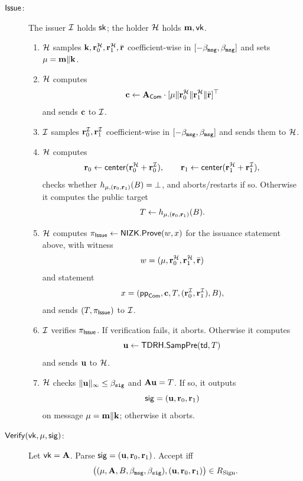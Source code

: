 \begin{description}
  \item[$\mathsf{Issue}$:] The issuer \(\mathcal{I}\) holds \(\mathsf{sk}\); the holder \(\mathcal{H}\) holds \(\mathbf{m},\mathsf{vk}\).
  \begin{enumerate}[leftmargin=1.25em]
    \item \(\mathcal{H}\) samples \(\mathbf{k},\mathbf{r}_0^{\mathcal{H}},\mathbf{r}_1^{\mathcal{H}},\bar{\mathbf{r}}\) coefficient-wise in
    \([ -\beta_{\mathtt{msg}},\beta_{\mathtt{msg}}]\) and sets \(\mathbf{\mu}=\mathbf{m}\Vert \mathbf{k}\).
    \item \(\mathcal{H}\) computes
    \[
      \mathbf{c}\gets \mathbf{A}_{\mathsf{Com}}\cdot[\mathbf{\mu}\Vert \mathbf{r}_0^{\mathcal{H}}\Vert \mathbf{r}_1^{\mathcal{H}}\Vert \bar{\mathbf{r}}]^\top
    \]
    and sends \(\mathbf{c}\) to \(\mathcal{I}\).
    \item \(\mathcal{I}\) samples \(\mathbf{r}_0^{\mathcal{I}},\mathbf{r}_1^{\mathcal{I}}\) coefficient-wise in
    \([ -\beta_{\mathtt{msg}},\beta_{\mathtt{msg}}]\) and sends them to \(\mathcal{H}\).
    \item \(\mathcal{H}\) computes
    \[
      \mathbf{r}_0\gets \mathsf{center}(\mathbf{r}_0^{\mathcal{H}}+\mathbf{r}_0^{\mathcal{I}}),\qquad
      \mathbf{r}_1\gets \mathsf{center}(\mathbf{r}_1^{\mathcal{H}}+\mathbf{r}_1^{\mathcal{I}}),
    \]
    checks whether \(h_{\mathbf{\mu},(\mathbf{r}_0,\mathbf{r}_1)}(B)=\bot\), and aborts/restarts if so. Otherwise it computes the public target
    \[
      T\gets h_{\mathbf{\mu},(\mathbf{r}_0,\mathbf{r}_1)}(B).
    \]
    \item \(\mathcal{H}\) computes \(\pi_{\mathsf{Issue}}\gets \mathsf{NIZK}.\mathsf{Prove}(w,x)\) for the issuance statement above, with witness
    \[
      w=(\mathbf{\mu},\mathbf{r}_0^{\mathcal{H}},\mathbf{r}_1^{\mathcal{H}},\bar{\mathbf{r}})
    \]
    and statement
    \[
      x=(\mathsf{pp}_{\mathsf{Com}},\mathbf{c},T,(\mathbf{r}_0^{\mathcal{I}},\mathbf{r}_1^{\mathcal{I}}),B),
    \]
    and sends \((T,\pi_{\mathsf{Issue}})\) to \(\mathcal{I}\).
    \item \(\mathcal{I}\) verifies \(\pi_{\mathsf{Issue}}\). If verification fails, it aborts.
    Otherwise it computes
    \[
      \mathbf{u}\gets \mathsf{TDRH}.\mathsf{SampPre}(\mathsf{td},T)
    \]
    and sends \(\mathbf{u}\) to \(\mathcal{H}\).
    \item \(\mathcal{H}\) checks \(\|\mathbf{u}\|_\infty\le \beta_{\mathtt{sig}}\) and \(\mathbf{A}\mathbf{u}=T\). If so, it outputs
    \[
      \mathsf{sig}=(\mathbf{u},\mathbf{r}_0,\mathbf{r}_1)
    \]
    on message \(\mathbf{\mu}=\mathbf{m}\Vert \mathbf{k}\); otherwise it aborts.
  \end{enumerate}

  \item[$\mathsf{Verify}(\mathsf{vk},\mathbf{\mu},\mathsf{sig})$:] Let \(\mathsf{vk}=\mathbf{A}\). Parse \(\mathsf{sig}=(\mathbf{u},\mathbf{r}_0,\mathbf{r}_1)\). Accept iff
  \[
    \bigl((\mathbf{\mu},\mathbf{A},B,\beta_{\mathtt{msg}},\beta_{\mathtt{sig}}),(\mathbf{u},\mathbf{r}_0,\mathbf{r}_1)\bigr)\in R_{\mathrm{Sign}}.
  \]
\end{description}

